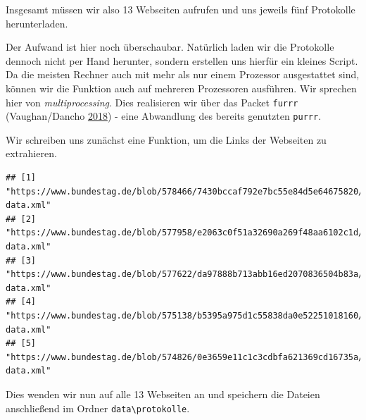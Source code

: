 \documentclass[oneside, 12pt]{scrbook}
\newenvironment{Shaded}{\begin{snugshade}}{\end{snugshade}}
\newcommand{\ControlFlowTok}[1]{\textcolor[rgb]{0.13,0.29,0.53}{\textbf{#1}}}
\newcommand{\KeywordTok}[1]{\textcolor[rgb]{0.13,0.29,0.53}{\textbf{#1}}}
\newcommand{\NormalTok}[1]{#1}
\newcommand{\OperatorTok}[1]{\textcolor[rgb]{0.81,0.36,0.00}{\textbf{#1}}}
\newcommand{\StringTok}[1]{\textcolor[rgb]{0.31,0.60,0.02}{#1}}
\theoremstyle{definition}
\theoremstyle{definition}
\theoremstyle{definition}
\theoremstyle{remark}
\begin{document}
Insgesamt müssen wir also 13 Webseiten aufrufen und uns jeweils fünf
Protokolle herunterladen.

Der Aufwand ist hier noch überschaubar. Natürlich laden wir die
Protokolle dennoch nicht per Hand herunter, sondern erstellen uns
hierfür ein kleines Script. Da die meisten Rechner auch mit mehr als nur
einem Prozessor ausgestattet sind, können wir die Funktion auch auf
mehreren Prozessoren ausführen. Wir sprechen hier von
\emph{multiprocessing}. Dies realisieren wir über das Packet
\texttt{furrr} (Vaughan/Dancho
\protect\hyperlink{ref-vaughan_2018}{2018}) - eine Abwandlung des
bereits genutzten \texttt{purrr}.

Wir schreiben uns zunächst eine Funktion, um die Links der Webseiten zu
extrahieren.

\begin{Shaded}
\end{Shaded}

\begin{verbatim}
## [1] "https://www.bundestag.de/blob/578466/7430bccaf792e7bc55e84d5e64675820/19062-data.xml"
## [2] "https://www.bundestag.de/blob/577958/e2063c0f51a32690a269f48aa6102c1d/19061-data.xml"
## [3] "https://www.bundestag.de/blob/577622/da97888b713abb16ed2070836504b83a/19060-data.xml"
## [4] "https://www.bundestag.de/blob/575138/b5395a975d1c55838da0e52251018160/19059-data.xml"
## [5] "https://www.bundestag.de/blob/574826/0e3659e11c1c3cdbfa621369cd16735a/19058-data.xml"
\end{verbatim}

Dies wenden wir nun auf alle 13 Webseiten an und speichern die Dateien
anschließend im Ordner \texttt{data\textbackslash{}protokolle}.
\end{document}
